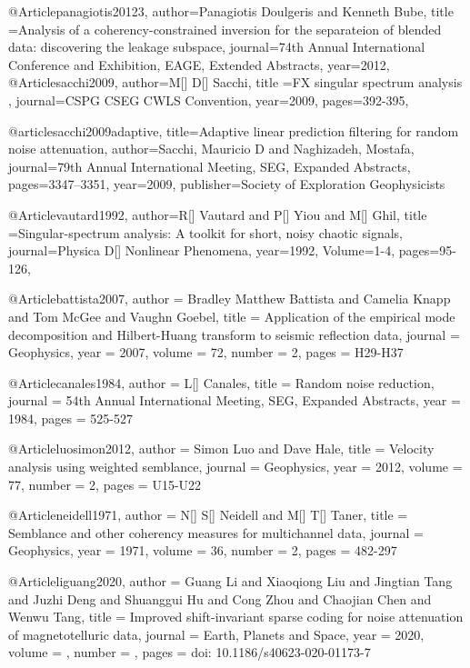 @Article{panagiotis20123,
  author={Panagiotis Doulgeris and Kenneth Bube},
  title ={Analysis of a coherency-constrained inversion for the separateion of blended data: discovering the leakage subspace},
  journal={74th Annual International Conference and Exhibition, EAGE, Extended Abstracts},
  year=2012,
  }
@Article{sacchi2009,
  author={M[] D[] Sacchi},
  title ={{FX} singular spectrum analysis },
  journal={CSPG CSEG CWLS Convention},
  year=2009,
  pages={392-395},
}

@article{sacchi2009adaptive,
  title={Adaptive linear prediction filtering for random noise attenuation},
  author={Sacchi, Mauricio D and Naghizadeh, Mostafa},
  journal={79th Annual International Meeting, SEG, Expanded Abstracts},
  pages={3347--3351},
  year={2009},
  publisher={Society of Exploration Geophysicists}
}

@Article{vautard1992,
  author={R[] Vautard and P[] Yiou and M[] Ghil},
  title ={Singular-spectrum analysis: A toolkit for short, noisy chaotic signals},
  journal={Physica D[] Nonlinear Phenomena},
  year=1992,
  Volume=1-4,
  pages={95-126},
}

@Article{battista2007,
  author = 	 {Bradley Matthew Battista and Camelia Knapp and Tom McGee and Vaughn Goebel},
  title = 	 {Application of the empirical mode decomposition and
{Hilbert-Huang} transform to seismic reflection data},
  journal = 	 {Geophysics},
  year = 	 2007,
  volume = 	 72,
  number = 	 2,
  pages = 	 {H29-H37}}

@Article{canales1984,
  author = 	 {L[] Canales},
  title = 	 {Random noise reduction},
  journal = 	 {54th Annual International Meeting, SEG, Expanded Abstracts},
  year = 	 1984,
  pages =	 {525-527}
}

@Article{luosimon2012,
  author = 	 {Simon Luo and Dave Hale},
  title = 	 {Velocity analysis using weighted semblance},
  journal = 	 {Geophysics},
  year = 	 2012,
  volume = 	 77,
  number = 	 2,
  pages = 	 {U15-U22}}


@Article{neidell1971,
  author = 	 {N[] S[] Neidell and M[] T[] Taner},
  title = 	 {Semblance and other coherency measures for multichannel data},
  journal = 	 {Geophysics},
  year = 	 1971,
  volume = 	 36,
  number = 	 2,
  pages = 	 {482-297}}

@Article{liguang2020,
  author = 	 {Guang Li and Xiaoqiong Liu and Jingtian Tang and Juzhi Deng and Shuanggui Hu and Cong Zhou and Chaojian Chen and Wenwu Tang},
  title = 	 {Improved shift-invariant sparse coding for noise attenuation of magnetotelluric data},
  journal = 	 {Earth, Planets and Space},
  year = 	 2020,
  volume = 	 ,
  number = 	 ,
  pages = 	 {doi: 10.1186/s40623-020-01173-7}}
  



